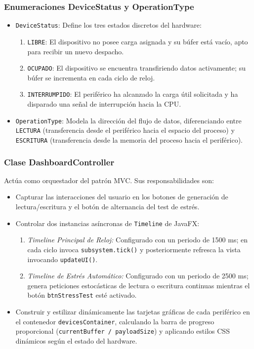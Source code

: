 \documentclass[11pt,letterpaper]{article}
\begin{document}
\subsubsection{Enumeraciones DeviceStatus y OperationType}
\begin{itemize}
    \item \texttt{DeviceStatus}: Define los tres estados discretos del hardware:
    \begin{enumerate}
        \item \texttt{LIBRE}: El dispositivo no posee carga asignada y su búfer está vacío, apto para recibir un nuevo despacho.
        \item \texttt{OCUPADO}: El dispositivo se encuentra transfiriendo datos activamente; su búfer se incrementa en cada ciclo de reloj.
        \item \texttt{INTERRUMPIDO}: El periférico ha alcanzado la carga útil solicitada y ha disparado una señal de interrupción hacia la CPU.
    \end{enumerate}
    \item \texttt{OperationType}: Modela la dirección del flujo de datos, diferenciando entre \texttt{LECTURA} (transferencia desde el periférico hacia el espacio del proceso) y \texttt{ESCRITURA} (transferencia desde la memoria del proceso hacia el periférico).
\end{itemize}

\subsubsection{Clase DashboardController}
Actúa como orquestador del patrón MVC. Sus responsabilidades son:
\begin{itemize}
    \item Capturar las interacciones del usuario en los botones de generación de lectura/escritura y el botón de alternancia del test de estrés.
    \item Controlar dos instancias asíncronas de \texttt{Timeline} de JavaFX:
    \begin{enumerate}
        \item \textit{Timeline Principal de Reloj:} Configurado con un periodo de 1500 ms; en cada ciclo invoca \texttt{subsystem.tick()} y posteriormente refresca la vista invocando \texttt{updateUI()}.
        \item \textit{Timeline de Estrés Automático:} Configurado con un periodo de 2500 ms; genera peticiones estocásticas de lectura o escritura continuas mientras el botón \texttt{btnStressTest} esté activado.
    \end{enumerate}
    \item Construir y estilizar dinámicamente las tarjetas gráficas de cada periférico en el contenedor \texttt{devicesContainer}, calculando la barra de progreso proporcional (\texttt{currentBuffer / payloadSize}) y aplicando estilos CSS dinámicos según el estado del hardware.
\end{itemize}
\end{document}
